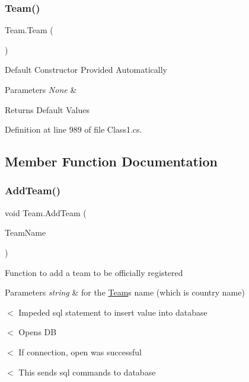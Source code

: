 \subsubsection{\texorpdfstring{Team()}{Team()}}
{\footnotesize\ttfamily Team.\+Team (\begin{DoxyParamCaption}{ }\end{DoxyParamCaption})\hspace{0.3cm}{\ttfamily [inline]}}

Default Constructor Provided Automatically 
\begin{DoxyParams}{Parameters}
{\em None} & \\
\hline
\end{DoxyParams}
\begin{DoxyReturn}{Returns}
Default Values 
\end{DoxyReturn}


Definition at line 989 of file Class1.\+cs.



\subsection{Member Function Documentation}
\mbox{\label{classTeam_a057fd5f0d29ee5d92f47b312e0fc6dbf}} 
\subsubsection{\texorpdfstring{Add\+Team()}{AddTeam()}}
{\footnotesize\ttfamily void Team.\+Add\+Team (\begin{DoxyParamCaption}\item[{string}]{Team\+Name }\end{DoxyParamCaption})\hspace{0.3cm}{\ttfamily [inline]}}

Function to add a team to be officially registered 
\begin{DoxyParams}{Parameters}
{\em string} & for the \hyperlink{classTeam}{Team}\textquotesingle{}s name (which is country name) \\
\hline
\end{DoxyParams}
$<$ Impeded sql statement to insert value into database

$<$ Opens DB

$<$ If connection, open was successful

$<$ This sends sql commands to database 

